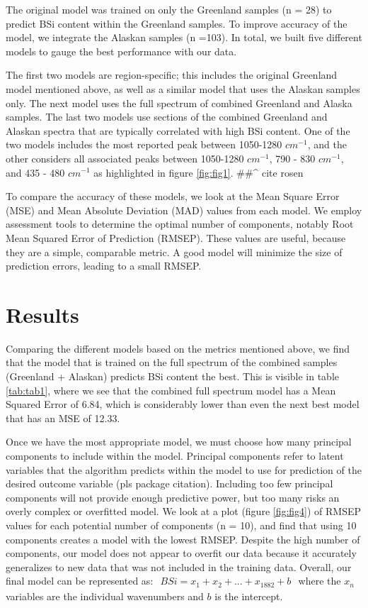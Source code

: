 \documentclass[water,article,submit,moreauthors,pdftex]{mdpi}
\begin{document}
The original model was trained on only the Greenland samples (n = 28) to
predict BSi content within the Greenland samples. To improve accuracy of
the model, we integrate the Alaskan samples (n =103). In total, we built
five different models to gauge the best performance with our data.

The first two models are region-specific; this includes the original
Greenland model mentioned above, as well as a similar model that uses
the Alaskan samples only. The next model uses the full spectrum of
combined Greenland and Alaska samples. The last two models use sections
of the combined Greenland and Alaskan spectra that are typically
correlated with high BSi content. One of the two models includes the
most reported peak between 1050-1280 \(cm^{-1}\), and the other
considers all associated peaks between 1050-1280 \(cm^{-1}\), 790 - 830
\(cm^{-1}\), and 435 - 480 \(cm^{-1}\) as highlighted in figure
\ref{fig:fig1}. \#\#\^{} cite rosen

To compare the accuracy of these models, we look at the Mean Square
Error (MSE) and Mean Absolute Deviation (MAD) values from each model. We
employ assessment tools to determine the optimal number of components,
notably Root Mean Squared Error of Prediction (RMSEP). These values are
useful, because they are a simple, comparable metric. A good model will
minimize the size of prediction errors, leading to a small RMSEP.

\hypertarget{results}{%
\section{Results}\label{results}}

Comparing the different models based on the metrics mentioned above, we
find that the model that is trained on the full spectrum of the combined
samples (Greenland + Alaskan) predicts BSi content the best. This is
visible in table \ref{tab:tab1}, where we see that the combined full
spectrum model has a Mean Squared Error of 6.84, which is considerably
lower than even the next best model that has an MSE of 12.33.

Once we have the most appropriate model, we must choose how many
principal components to include within the model. Principal components
refer to latent variables that the algorithm predicts within the model
to use for prediction of the desired outcome variable (pls package
citation). Including too few principal components will not provide
enough predictive power, but too many risks an overly complex or
overfitted model. We look at a plot (figure \ref{fig:fig4}) of RMSEP
values for each potential number of components (n = 10), and find that
using 10 components creates a model with the lowest RMSEP. Despite the
high number of components, our model does not appear to overfit our data
because it accurately generalizes to new data that was not included in
the training data. Overall, our final model can be represented as:
\(\begin{gather} BSi = x_1 + x_2 + . . . + x_{1882} + b \end{gather}\)
where the \(x_n\) variables are the individual wavenumbers and \(b\) is
the intercept.
\end{document}
